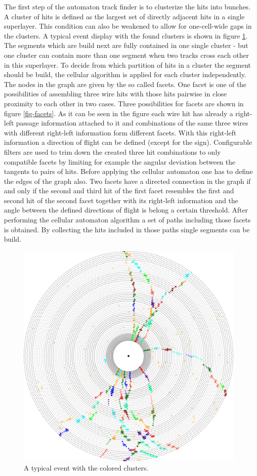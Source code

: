 The first step of the automaton track finder is to clusterize the hits into bunches. A cluster of hits is defined as the largest set of directly adjacent hits in a single superlayer. This condition can also be weakened to allow for one-cell-wide gaps in the clusters. A typical event display with the found clusters is shown in figure \ref{fig-clusters}. The segments which are build next are fully contained in one single cluster - but one cluster can contain more than one segment when two tracks cross each other in this superlayer. To decide from which partition of hits in a cluster the segment should be build, the cellular algorithm is applied for each cluster independently. The nodes in the graph are given by the so called facets. One facet is one of the possibilities of assembling three wire hits with those hits pairwise in close proximity to each other in two cases. Three possibilities for facets are shown in figure \ref{fig-facets}. As it can be seen in the figure each wire hit has already a right-left passage information attached to it and combinations of the same three wires with different right-left information form different facets. With this right-left information a direction of flight can be defined (except for the sign). Configurable filters are used to trim down the created three hit combinations to only compatible facets by limiting for example the angular deviation between the tangents to pairs of hits. Before applying the cellular automaton one has to define the edges of the graph also. Two facets have a directed connection in the graph if and only if the second and third hit of the first facet resembles the first and second hit of the second facet together with its right-left information and the angle between the defined directions of flight is belong a certain threshold. After performing the cellular automaton algorithm a set of paths including those facets is obtained. By collecting the hits included in those paths single segments can be build.

\begin{figure}
  \centering
  \includegraphics[width=0.8\linewidth]{figures/theory/segments.png} 
  \caption[Clusters in the automaton track finder.]{A typical event with the colored clusters.}
  \label{fig-clusters}
\end{figure}

